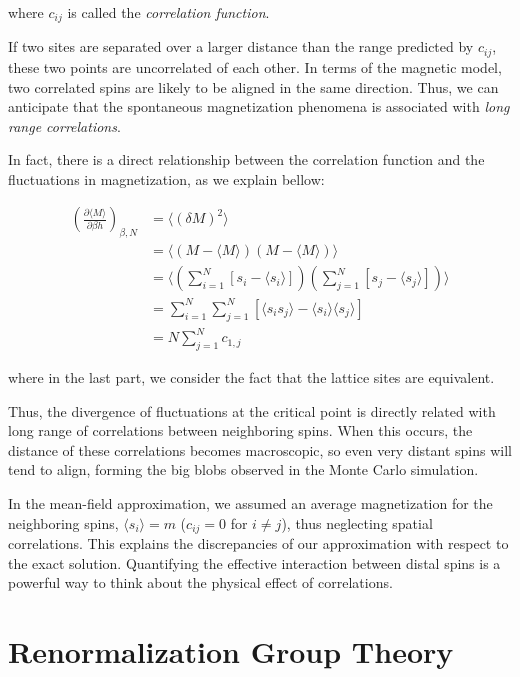 \documentclass[book.tex]{subfiles}
\begin{document}
\noindent where $c_{ij}$ is called the \textit{correlation function}. 

If two sites are separated over a larger distance than the range predicted by $c_{ij}$, these two points are uncorrelated of each other. In terms of the magnetic model, two correlated spins are likely to be aligned in the same direction. Thus, we can anticipate that the spontaneous magnetization phenomena is associated with \textit{long range correlations}.

In fact, there is a direct relationship between the correlation function and the fluctuations in magnetization, as we explain bellow:

\begin{align}
\left(\frac{\partial \langle M\rangle}{\partial \beta h}\right)_{\beta,N} &= \langle (\delta M)^2\rangle \\
&= \langle (M - \langle M \rangle)(M - \langle M \rangle)\rangle \\
&= \Bigg\langle \left(\sum_{i=1}^N \left[ s_i - \langle s_i\rangle \right] \right)\left(\sum_{j=1}^N \left[ s_j - \langle s_j\rangle \right]\right)\Bigg\rangle \\
&=\sum_{i=1}^N\sum_{j=1}^N \left[\langle s_i s_j \rangle - \langle s_i\rangle\langle s_j\rangle\right] \\
&=N\sum_{j=1}^N c_{1,j} 
\end{align}

\noindent where in the last part, we consider the fact that the lattice sites are equivalent.

Thus, the divergence of fluctuations at the critical point is directly related with long range of correlations between neighboring spins. When this occurs, the distance of these correlations becomes macroscopic, so even very distant spins will tend to align, forming the big blobs observed in the Monte Carlo simulation.

In the mean-field approximation, we assumed an average magnetization for the neighboring spins, $\langle s_i \rangle = m$ ($c_{i j} = 0$ for $i \neq j$), thus neglecting spatial correlations. This explains the discrepancies of our approximation  with respect to the exact solution. Quantifying the effective interaction between distal spins is a powerful way to think about the physical effect of correlations.

\section{Renormalization Group Theory}
\end{document}
